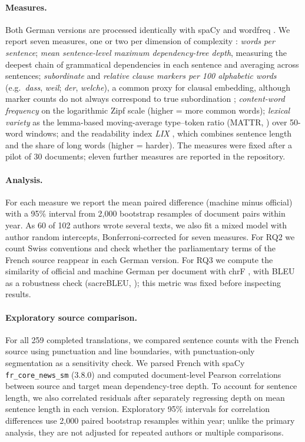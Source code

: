 \documentclass[11pt,a4paper]{article}
\begin{document}
\paragraph{Measures.} Both German versions are processed identically with spaCy
\citep{spacy} and wordfreq \citep{wordfreq}. We report seven measures, one or
two per dimension of complexity \citep{biber1992}:
\emph{words per sentence};
\emph{mean sentence-level maximum dependency-tree depth}, measuring the deepest chain of grammatical dependencies in each sentence and averaging across sentences; \emph{subordinate} and \emph{relative clause markers per 100 alphabetic words}
(e.g.\ \emph{dass}, \emph{weil}; \emph{der}, \emph{welche}), a common proxy for
clausal embedding, although marker counts do not always correspond to true
subordination \citep{schleppegrell1992};
\emph{content-word frequency} on the logarithmic Zipf scale (higher = more
common words);
\emph{lexical variety} as the lemma-based moving-average type--token ratio (MATTR, \citealp{covington2010}) over 50-word windows; and the readability index \emph{LIX} \citep{bjornsson1968}, which combines sentence length and the share
of long words (higher = harder). The measures were fixed after a pilot of 30 documents; eleven further measures
are reported in the repository.

\paragraph{Analysis.} For each measure we report the mean paired difference
(machine minus official) with a 95\% interval from 2,000 bootstrap resamples of
document pairs within year. As 60 of 102 authors wrote several texts, we also fit a mixed
model with author random intercepts, Bonferroni-corrected for seven measures. For RQ2 we count Swiss conventions and check whether
the parliamentary terms of the French source reappear in each German version. For
RQ3 we compute the similarity of official and machine German per document with
chrF \citep{popovic2015}, with BLEU \citep{papineni2002} as a robustness check
(sacreBLEU, \citealp{post2018}); this metric was fixed before inspecting results.

\paragraph{Exploratory source comparison.} For all 259 completed translations, we compared sentence counts with the French source using punctuation and line boundaries, with punctuation-only segmentation as a sensitivity check. We parsed French with spaCy \texttt{fr\_core\_news\_sm} (3.8.0) and computed document-level Pearson correlations between source and target mean dependency-tree depth. To account for sentence length, we also correlated residuals after separately regressing depth on mean sentence length in each version. Exploratory 95\% intervals for correlation differences use 2,000 paired bootstrap resamples within year; unlike the primary analysis, they are not adjusted for repeated authors or multiple comparisons.
\end{document}
